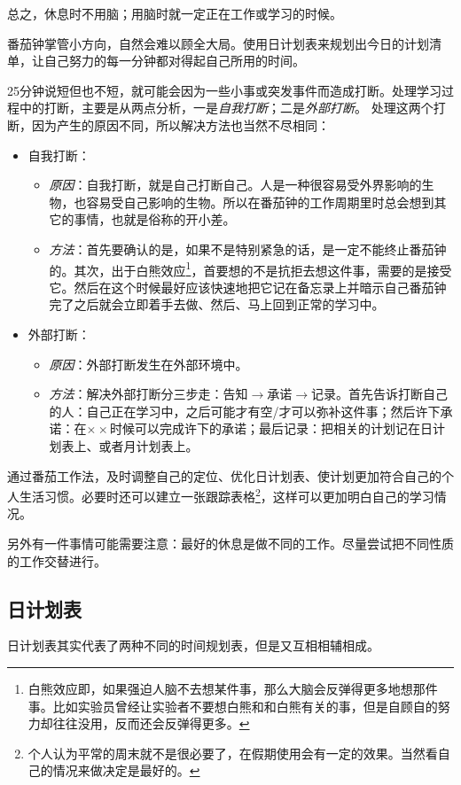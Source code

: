 \documentclass[b5paper]{ctexart}
\begin{document}
			总之，休息时不用脑；用脑时就一定正在工作或学习的时候。

			番茄钟掌管小方向，自然会难以顾全大局。使用日计划表来规划出今日的计划清单，让自己努力的每一分钟都对得起自己所用的时间。

			25分钟说短但也不短，就可能会因为一些小事或突发事件而造成打断。处理学习过程中的打断，主要是从两点分析，一是\emph{自我打断}；二是\emph{外部打断}。%
			处理这两个打断，因为产生的原因不同，所以解决方法也当然不尽相同：
			\begin{itemize}
				\item 自我打断：
				\begin{itemize}[leftmargin=2em]
					\item \emph{原因}：自我打断，就是自己打断自己。人是一种很容易受外界影响的生物，也容易受自己影响的生物。所以在番茄钟的工作周期里时总会想到其它的事情，也就是俗称的开小差。
					\item \emph{方法}：首先要确认的是，如果不是特别紧急的话，是一定不能终止番茄钟的。其次，出于白熊效应\footnote{白熊效应即，如果强迫人脑不去想某件事，那么大脑会反弹得更多地想那件事。比如实验员曾经让实验者不要想白熊和和白熊有关的事，但是自顾自的努力却往往没用，反而还会反弹得更多。}，首要想的不是抗拒去想这件事，需要的是接受它。然后在这个时候最好应该快速地把它记在备忘录上并暗示自己番茄钟完了之后就会立即着手去做、然后、马上回到正常的学习中。
				\end{itemize}
				\item 外部打断：
				\begin{itemize}[leftmargin=2em]
					\item \emph{原因}：外部打断发生在外部环境中。
					\item \emph{方法}：解决外部打断分三步走：告知$\to$承诺$\to$记录。首先告诉打断自己的人：自己正在学习中，之后可能才有空/才可以弥补这件事；然后许下承诺：在$\times\times$时候可以完成许下的承诺；最后记录：把相关的计划记在日计划表上、或者月计划表上。
				\end{itemize}
			\end{itemize} 
			
			通过番茄工作法，及时调整自己的定位、优化日计划表、使计划更加符合自己的个人生活习惯。必要时还可以建立一张跟踪表格\footnote{个人认为平常的周末就不是很必要了，在假期使用会有一定的效果。当然看自己的情况来做决定是最好的。}，这样可以更加明白自己的学习情况。

			另外有一件事情可能需要注意：最好的休息是做不同的工作。尽量尝试把不同性质的工作交替进行。
		
		\subsection{日计划表}
			日计划表其实代表了两种不同的时间规划表，但是又互相相辅相成。%
\end{document}
